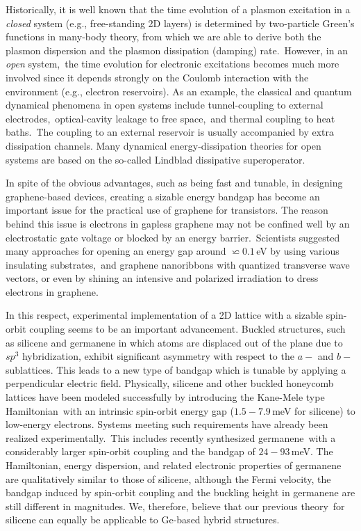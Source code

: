 \documentclass[aps,prb,showpacs]{revtex4}
\begin{document}
Historically, it is well known that the time evolution of a plasmon excitation
in a {\em closed} system (e.g., free-standing 2D layers) is determined by two-particle Green's functions in many-body theory, 
from which we are able to derive both the plasmon dispersion and the
plasmon dissipation (damping) rate.\,\cite{Gbook}
However, in an {\em open} system,\,\cite{dhh-2,dhh-3,dhh-4,dhh-5,dhh-6,dhh-7,dhh-8, Rec} the time evolution
for electronic excitations becomes much more involved since it depends strongly on the Coulomb interaction with the environment (e.g., electron reservoirs). 
As an example, the classical and quantum dynamical phenomena in open systems include tunnel-coupling to external electrodes,\,\cite{dhh-9} 
optical-cavity leakage to free space,\,\cite{dhh-10} and thermal coupling to heat baths.\,\cite{dhh-11} 
The coupling to an external reservoir is usually accompanied by extra dissipation channels. Many dynamical energy-dissipation theories for open systems
are based on the so-called Lindblad dissipative superoperator.\,\cite{dhh-12}
\medskip

In spite of the obvious advantages, such as being fast and tunable, in designing graphene-based devices, creating a sizable energy bandgap
has become an important issue for the practical use of graphene for transistors. The reason behind this issue is electrons in gapless graphene
may not be confined well by an electrostatic gate voltage or blocked by an energy barrier.\,\cite{Kl,ezawa} Scientists suggested
many approaches for opening an energy gap around $\backsimeq 0.1\,$eV by using various insulating substrates,\,\cite{gap2, gap3, gap4}
and graphene nanoribbons with quantized transverse wave vectors, or even by shining an intensive and polarized irradiation to dress electrons in graphene.\,\cite{kibis}
\medskip

In this respect, experimental implementation of a 2D lattice with a sizable spin-orbit
coupling seems to be an important advancement. Buckled structures, such as silicene and germanene in which
atoms are displaced out of the plane due to $sp^3$ hybridization, exhibit significant
asymmetry with respect to the $a-$ and $b-$sublattices. This leads to a new type of bandgap which is tunable by applying a perpendicular electric
field. Physically, silicene and other buckled honeycomb lattices have been modeled successfully by introducing the Kane-Mele type Hamiltonian\,\cite{KaneMele} 
with an intrinsic spin-orbit energy gap ($1.5 - 7.9\,$meV for silicene) to low-energy electrons. 
Systems meeting such requirements have already been realized experimentally.\,\cite{ezawa,ezawaprl,ezawa9prl} This includes 
recently synthesized germanene\,\cite{G1zhang,G2acun,G11li,G12davila,G13bampoulis,G14derivaz} with a considerably
larger spin-orbit coupling and the bandgap of $24-93\,$meV. The Hamiltonian, energy dispersion, and 
related electronic properties of germanene are qualitatively similar to those of silicene, although the Fermi velocity, 
the bandgap induced by spin-orbit coupling and the buckling height in germanene are still different in magnitudes. 
We, therefore, believe that our previous theory\,\cite{previous} for silicene can equally be applicable to Ge-based hybrid structures. 
\medskip
\end{document}
